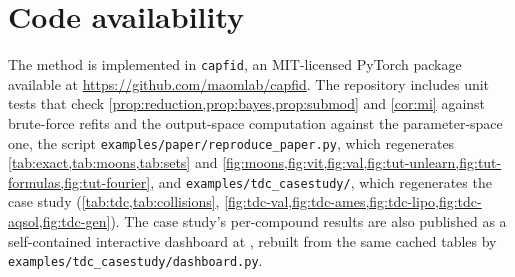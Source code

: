 \documentclass[10pt,twocolumn,letterpaper]{article}
\newif\ifanonymous
\newcommand{\coderepo}{\url{https://github.com/maomlab/capfid}}
\theoremstyle{definition}
\begin{document}
\section*{Code availability}
\ifanonymous
The implementation, unit tests, and scripts that regenerate every figure and table are provided as anonymized supplementary material and will be released publicly upon publication.
\else
The method is implemented in \texttt{capfid}, an MIT-licensed PyTorch package available at \coderepo. The repository includes unit tests that check \cref{prop:reduction,prop:bayes,prop:submod} and \cref{cor:mi} against brute-force refits and the output-space computation against the parameter-space one, the script \texttt{examples/paper/reproduce\_paper.py}, which regenerates \cref{tab:exact,tab:moons,tab:sets} and \cref{fig:moons,fig:vit,fig:val,fig:tut-unlearn,fig:tut-formulas,fig:tut-fourier}, and \texttt{examples/tdc\_casestudy/}, which regenerates the case study (\cref{tab:tdc,tab:collisions}, \cref{fig:tdc-val,fig:tdc-ames,fig:tdc-lipo,fig:tdc-aqsol,fig:tdc-gen}). The case study's per-compound results are also published as a self-contained interactive dashboard at \dashboardurl, rebuilt from the same cached tables by \texttt{examples/tdc\_casestudy/dashboard.py}.
\fi
\end{document}
